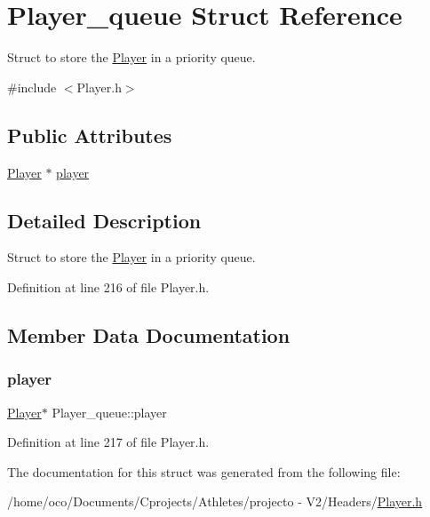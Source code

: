 \hypertarget{struct_player__queue}{}\section{Player\+\_\+queue Struct Reference}
\label{struct_player__queue}


Struct to store the \hyperlink{class_player}{Player} in a priority queue.  




{\ttfamily \#include $<$Player.\+h$>$}

\subsection*{Public Attributes}
\begin{DoxyCompactItemize}
\item 
\hyperlink{class_player}{Player} $\ast$ \hyperlink{struct_player__queue_a993b14d06659290be7b7d1970a3c8fe3}{player}
\end{DoxyCompactItemize}


\subsection{Detailed Description}
Struct to store the \hyperlink{class_player}{Player} in a priority queue. 

Definition at line 216 of file Player.\+h.



\subsection{Member Data Documentation}
\hypertarget{struct_player__queue_a993b14d06659290be7b7d1970a3c8fe3}{}\label{struct_player__queue_a993b14d06659290be7b7d1970a3c8fe3} 
\subsubsection{\texorpdfstring{player}{player}}
{\footnotesize\ttfamily \hyperlink{class_player}{Player}$\ast$ Player\+\_\+queue\+::player}



Definition at line 217 of file Player.\+h.



The documentation for this struct was generated from the following file\+:\begin{DoxyCompactItemize}
\item 
/home/oco/\+Documents/\+Cprojects/\+Athletes/projecto -\/ V2/\+Headers/\hyperlink{_player_8h}{Player.\+h}\end{DoxyCompactItemize}
